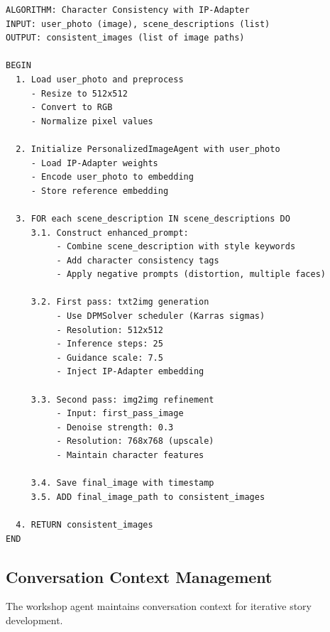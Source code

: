 \begin{verbatim}
ALGORITHM: Character Consistency with IP-Adapter
INPUT: user_photo (image), scene_descriptions (list)
OUTPUT: consistent_images (list of image paths)

BEGIN
  1. Load user_photo and preprocess
     - Resize to 512x512
     - Convert to RGB
     - Normalize pixel values
  
  2. Initialize PersonalizedImageAgent with user_photo
     - Load IP-Adapter weights
     - Encode user_photo to embedding
     - Store reference embedding
  
  3. FOR each scene_description IN scene_descriptions DO
     3.1. Construct enhanced_prompt:
          - Combine scene_description with style keywords
          - Add character consistency tags
          - Apply negative prompts (distortion, multiple faces)
     
     3.2. First pass: txt2img generation
          - Use DPMSolver scheduler (Karras sigmas)
          - Resolution: 512x512
          - Inference steps: 25
          - Guidance scale: 7.5
          - Inject IP-Adapter embedding
     
     3.3. Second pass: img2img refinement
          - Input: first_pass_image
          - Denoise strength: 0.3
          - Resolution: 768x768 (upscale)
          - Maintain character features
     
     3.4. Save final_image with timestamp
     3.5. ADD final_image_path to consistent_images
  
  4. RETURN consistent_images
END
\end{verbatim}

\subsection{Conversation Context Management}

The workshop agent maintains conversation context for iterative story development.

